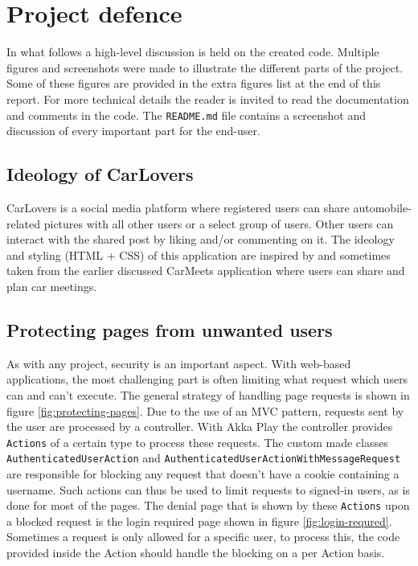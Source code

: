 \chapter{Project defence}
\label{ch:project_defence}

In what follows a high-level discussion is held on the created code.
Multiple figures and screenshots were made to illustrate the different parts of the project.
Some of these figures are provided in the extra figures list at the end of this report.
For more technical details the reader is invited to read the documentation and comments in the code. 
The \texttt{README.md} file contains a screenshot and discussion of every important part for the end-user.


\section{Ideology of CarLovers}
\label{sec:about_carlovers}

CarLovers is a social media platform where registered users can share automobile-related pictures with all other users or a select group of users. 
Other users can interact with the shared post by liking and/or commenting on it.
The ideology and styling (HTML + CSS) of this application are inspired by and sometimes taken from the earlier discussed CarMeets application \citep{github_carmeets} where users can share and plan car meetings.


\section{Protecting pages from unwanted users}
\label{sec:protecting_pages}

As with any project, security is an important aspect.
With web-based applications, the most challenging part is often limiting what request which users can and can't execute.
The general strategy of handling page requests is shown in figure \ref{fig:protecting-pages}.
Due to the use of an MVC pattern, requests sent by the user are processed by a controller.
With Akka Play the controller provides \texttt{Actions} of a certain type to process these requests.
The custom made classes \texttt{AuthenticatedUserAction} and \texttt{AuthenticatedUserActionWithMessageRequest} are responsible for blocking any request that doesn't have a cookie containing a username.
Such actions can thus be used to limit requests to signed-in users, as is done for most of the pages.
The denial page that is shown by these \texttt{Actions} upon a blocked request is the login required page shown in figure \ref{fig:login-requred}.
Sometimes a request is only allowed for a specific user, to process this, the code provided inside the Action should handle the blocking on a per Action basis.

